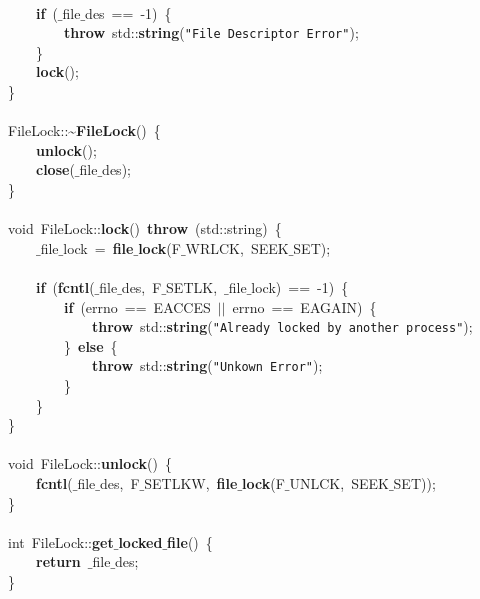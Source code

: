 \mbox{} \\
\mbox{}\ \ \ \ \textbf{if}\ ($\_$file$\_$des\ ==\ -1)\ \{ \\
\mbox{}\ \ \ \ \ \ \ \ \textbf{throw}\ std::\textbf{string}(\texttt{"{}File\ Descriptor\ Error"{}}); \\
\mbox{}\ \ \ \ \} \\
\mbox{}\ \ \ \ \textbf{lock}(); \\
\mbox{}\} \\
\mbox{} \\
\mbox{}FileLock::\textasciitilde{}\textbf{FileLock}()\ \{ \\
\mbox{}\ \ \ \ \textbf{unlock}(); \\
\mbox{}\ \ \ \ \textbf{close}($\_$file$\_$des); \\
\mbox{}\} \\
\mbox{} \\
\mbox{}void\ FileLock::\textbf{lock}()\ \textbf{throw}\ (std::string)\ \{ \\
\mbox{}\ \ \ \ $\_$file$\_$lock\ =\ \textbf{file$\_$lock}(F$\_$WRLCK,\ SEEK$\_$SET); \\
\mbox{} \\
\mbox{}\ \ \ \ \textbf{if}\ (\textbf{fcntl}($\_$file$\_$des,\ F$\_$SETLK,\ $\_$file$\_$lock)\ ==\ -1)\ \{ \\
\mbox{}\ \ \ \ \ \ \ \ \textbf{if}\ (errno\ ==\ EACCES\ $|$$|$\ errno\ ==\ EAGAIN)\ \{ \\
\mbox{}\ \ \ \ \ \ \ \ \ \ \ \ \textbf{throw}\ std::\textbf{string}(\texttt{"{}Already\ locked\ by\ another\ process"{}}); \\
\mbox{}\ \ \ \ \ \ \ \ \}\ \textbf{else}\ \{ \\
\mbox{}\ \ \ \ \ \ \ \ \ \ \ \ \textbf{throw}\ std::\textbf{string}(\texttt{"{}Unkown\ Error"{}}); \\
\mbox{}\ \ \ \ \ \ \ \ \} \\
\mbox{}\ \ \ \ \} \\
\mbox{}\} \\
\mbox{} \\
\mbox{}void\ FileLock::\textbf{unlock}()\ \{ \\
\mbox{}\ \ \ \ \textbf{fcntl}($\_$file$\_$des,\ F$\_$SETLKW,\ \textbf{file$\_$lock}(F$\_$UNLCK,\ SEEK$\_$SET)); \\
\mbox{}\} \\
\mbox{} \\
\mbox{}int\ FileLock::\textbf{get$\_$locked$\_$file}()\ \{ \\
\mbox{}\ \ \ \ \textbf{return}\ $\_$file$\_$des; \\
\mbox{}\} \\


